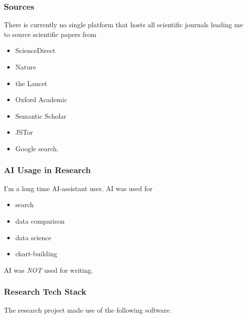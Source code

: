 \documentclass[
  letterpaper,
  DIV=11,
  numbers=noendperiod]{scrartcl}
\providecommand{\tightlist}{%
  \setlength{\itemsep}{0pt}\setlength{\parskip}{0pt}}\usepackage{longtable,booktabs,array}
\begin{document}
\subsubsection{Sources}\label{sources}

There is currently no single platform that hosts all scientific journals
leading me to source scientific papers from

\begin{itemize}
\tightlist
\item
  ScienceDirect
\item
  Nature
\item
  the Lancet
\item
  Oxford Academic
\item
  Semantic Scholar
\item
  JSTor
\item
  Google search.
\end{itemize}

\subsubsection{AI Usage in Research}\label{ai-usage-in-research}

I'm a long time AI-assistant user. AI was used for

\begin{itemize}
\tightlist
\item
  search
\item
  data comparison
\item
  data science
\item
  chart-building
\end{itemize}

AI was \emph{NOT} used for writing.

\subsubsection{Research Tech Stack}\label{research-tech-stack}

The research project made use of the following software.
\end{document}
